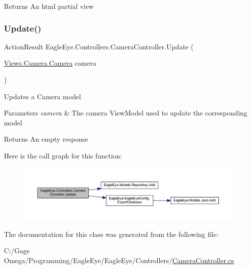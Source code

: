 \begin{DoxyReturn}{Returns}
An html partial view
\end{DoxyReturn}
\mbox{\label{class_eagle_eye_1_1_controllers_1_1_camera_controller_a9e43f7e6f051aa5dbc695d68b4b013ab}} 
\subsubsection{\texorpdfstring{Update()}{Update()}}
{\footnotesize\ttfamily Action\+Result Eagle\+Eye.\+Controllers.\+Camera\+Controller.\+Update (\begin{DoxyParamCaption}\item[{\mbox{\hyperlink{class_eagle_eye_1_1_views_1_1_camera_1_1_camera}{Views.\+Camera.\+Camera}}}]{camera }\end{DoxyParamCaption})}



Updates a Camera model 


\begin{DoxyParams}{Parameters}
{\em camera} & The camera View\+Model used to update the corresponding model\\
\hline
\end{DoxyParams}
\begin{DoxyReturn}{Returns}
An empty response
\end{DoxyReturn}
Here is the call graph for this function\+:\nopagebreak
\begin{figure}[H]
\begin{center}
\leavevmode
\includegraphics[width=350pt]{class_eagle_eye_1_1_controllers_1_1_camera_controller_a9e43f7e6f051aa5dbc695d68b4b013ab_cgraph}
\end{center}
\end{figure}


The documentation for this class was generated from the following file\+:\begin{DoxyCompactItemize}
\item 
C\+:/\+Gage Omega/\+Programming/\+Eagle\+Eye/\+Eagle\+Eye/\+Controllers/\mbox{\hyperlink{_camera_controller_8cs}{Camera\+Controller.\+cs}}\end{DoxyCompactItemize}
